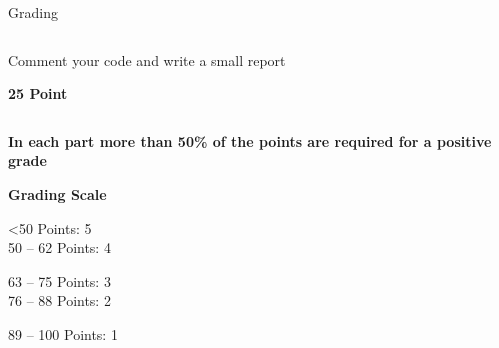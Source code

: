 \documentclass[aspectratio=169]{beamer}
\begin{document}
\begin{frame}{Grading}
\begin{columns}
\begin{column}{0.32\textwidth}
\begin{coloredblock}[blue][Homework 2][\footnotesize\centering][][6.5cm]
\begin{itemize}
                    Comment your code and write a small report
                \end{itemize}
            \end{coloredblock}
            \vspace{-.3cm}
            \centering \footnotesize \textbf{25 Point}
        \end{column}
    \end{columns}
    \vspace{0.7cm}
    \begin{coloredblock}[yellow]
        \centering\footnotesize\textbf{In each part more than 50\% of the points are required for a positive grade}
    \end{coloredblock}

    \vspace{0.2cm}
    \begin{coloredblock}[green]
        \begin{minipage}[c]{0.24\textwidth}
            \centering\footnotesize \textbf{Grading Scale}
        \end{minipage}
        \hfill
        \begin{minipage}[c]{0.24\textwidth}
            \footnotesize
            <50 Points:         5\\
            50 – 62 Points:     4
        \end{minipage}
        \hfill
        \begin{minipage}[c]{0.24\textwidth}
            \footnotesize
            63 – 75 Points:     3\\
            76 – 88 Points:     2
        \end{minipage}
        \hfill
        \begin{minipage}[t]{0.24\textwidth}
            \footnotesize
            89 – 100 Points:    1
        \end{minipage}
        
    \end{coloredblock}


\end{frame}
\end{document}
